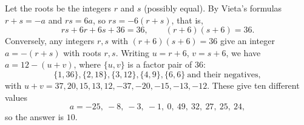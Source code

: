 Let the roots be the integers $r$ and $s$ (possibly equal). By Vieta's formulas $r+s=-a$ and $rs=6a$, so $rs=-6(r+s)$, that is,
\[rs+6r+6s+36=36,\qquad (r+6)(s+6)=36.\]
Conversely, any integers $r,s$ with $(r+6)(s+6)=36$ give an integer $a=-(r+s)$ with roots $r,s$. Writing $u=r+6$, $v=s+6$, we have $a=12-(u+v)$, where $\{u,v\}$ is a factor pair of $36$:
\[\{1,36\},\{2,18\},\{3,12\},\{4,9\},\{6,6\}\ \text{and their negatives},\]
with $u+v=37,20,15,13,12,-37,-20,-15,-13,-12$. These give ten different values
\[a=-25,\ -8,\ -3,\ -1,\ 0,\ 49,\ 32,\ 27,\ 25,\ 24,\]
so the answer is $\boxed{10}$.
